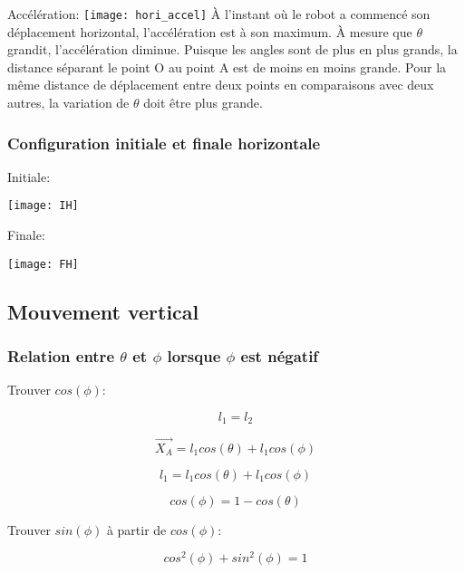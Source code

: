 \documentclass{article}
\begin{document}
\newpage
\noindent Accélération:
\newline
\noindent \texttt{[image: hori\_accel]}
À l'instant où le robot a commencé son déplacement horizontal, l'accélération est à son maximum. À mesure que $\theta$ grandit, l'accélération diminue. Puisque les angles sont de plus en plus grands, la distance séparant le point O au point A est de moins en moins grande. Pour la même distance de déplacement entre deux points en comparaisons avec deux autres, la variation de $\theta$ doit être plus grande.

\subsubsection{Configuration initiale et finale horizontale}
\noindent Initiale:
\newline
\centerline{\noindent \texttt{[image: IH]}}
\newline
\newline
\newpage
\noindent Finale:
\newline
\centerline{\noindent \texttt{[image: FH]}}
\newline

\subsection{Mouvement vertical}
\subsubsection{Relation entre $\theta$ et $\phi$ lorsque $\phi$ est négatif}
\noindent Trouver $cos(\phi)$:

\begin{equation}
l_1 = l_2
\end{equation}

\begin{equation}
\overrightarrow{X_A} = l_1cos(\theta)+l_1cos(\phi)
\end{equation}

\begin{equation}
l_1 = l_1cos(\theta)+l_1cos(\phi)
\end{equation}

\begin{equation}
cos(\phi) = 1-cos(\theta)
\end{equation}

\newpage
\noindent Trouver $sin(\phi)$ à partir de $cos(\phi)$:

\begin{equation}
cos^2(\phi)+sin^2(\phi) = 1
\end{equation}
\end{document}
